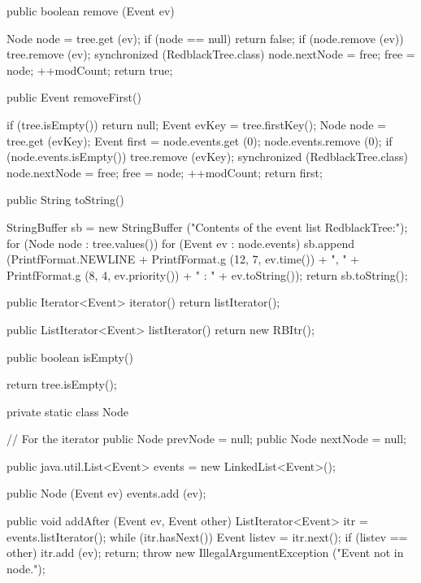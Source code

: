 \begin{hide}
\begin{code}
   public boolean remove (Event ev)\begin{hide} {
      Node node = tree.get (ev);
      if (node == null)
         return false;
      if (node.remove (ev)) {
         tree.remove (ev);
         synchronized (RedblackTree.class) {
            node.nextNode = free; free = node;
         }
      }
      ++modCount;
      return true;
   }\end{hide}

   public Event removeFirst()\begin{hide} {
      if (tree.isEmpty())
         return null;
      Event evKey = tree.firstKey();
      Node node = tree.get (evKey);
      Event first = node.events.get (0);
      node.events.remove (0);
      if (node.events.isEmpty()) {
         tree.remove (evKey);
         synchronized (RedblackTree.class) {
            node.nextNode = free; free = node;
         }
      }
      ++modCount;
      return first;
   }\end{hide}

   public String toString()\begin{hide} {
      StringBuffer sb = new StringBuffer ("Contents of the event list RedblackTree:");
      for (Node node : tree.values()) {
         for (Event ev : node.events)
            sb.append (PrintfFormat.NEWLINE +
                       PrintfFormat.g (12, 7, ev.time()) + ", " +
                       PrintfFormat.g (8, 4, ev.priority()) + " : " +
                       ev.toString());
      }
      return sb.toString();
   }

   public Iterator<Event> iterator() {
      return listIterator();
   }

   public ListIterator<Event> listIterator() {
      return new RBItr();
   }\end{hide}

   public boolean isEmpty()\begin{hide} {
      return tree.isEmpty();
   }

   private static class Node {
      // For the iterator
      public Node prevNode = null;
      public Node nextNode = null;

      public java.util.List<Event> events = new LinkedList<Event>();

      public Node (Event ev) {
         events.add (ev);
      }

      public void addAfter (Event ev, Event other) {
         ListIterator<Event> itr = events.listIterator();
         while (itr.hasNext()) {
            Event listev = itr.next();
            if (listev == other) {
               itr.add (ev);
               return;
            }
         }
         throw new IllegalArgumentException ("Event not in node.");
      }

}
\end{hide}
\end{code}
\end{hide}

